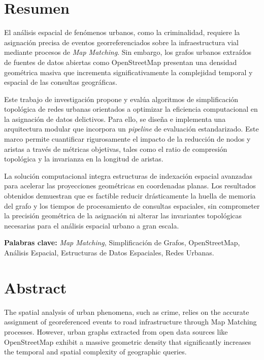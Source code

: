 \chapter*{Resumen}

El análisis espacial de fenómenos urbanos, como la criminalidad, requiere la asignación precisa de eventos georreferenciados sobre la infraestructura vial mediante procesos de \textit{Map Matching}. Sin embargo, los grafos urbanos extraídos de fuentes de datos abiertas como OpenStreetMap presentan una densidad geométrica masiva que incrementa significativamente la complejidad temporal y espacial de las consultas geográficas. 

Este trabajo de investigación propone y evalúa algoritmos de simplificación topológica de redes urbanas orientados a optimizar la eficiencia computacional en la asignación de datos delictivos. Para ello, se diseña e implementa una arquitectura modular que incorpora un \textit{pipeline} de evaluación estandarizado. Este marco permite cuantificar rigurosamente el impacto de la reducción de nodos y aristas a través de métricas objetivas, tales como el ratio de compresión topológica y la invarianza en la longitud de aristas. 

La solución computacional integra estructuras de indexación espacial avanzadas para acelerar las proyecciones geométricas en coordenadas planas. Los resultados obtenidos demuestran que es factible reducir drásticamente la huella de memoria del grafo y los tiempos de procesamiento de consultas espaciales, sin comprometer la precisión geométrica de la asignación ni alterar las invariantes topológicas necesarias para el análisis espacial urbano a gran escala.

\vspace{1cm}
\noindent \textbf{Palabras clave:} \textit{Map Matching}, Simplificación de Grafos, OpenStreetMap, Análisis Espacial, Estructuras de Datos Espaciales, Redes Urbanas.



\chapter*{Abstract}

The spatial analysis of urban phenomena, such as crime, relies on the accurate assignment of georeferenced events to road infrastructure through Map Matching processes. However, urban graphs extracted from open data sources like OpenStreetMap exhibit a massive geometric density that significantly increases the temporal and spatial complexity of geographic queries.


